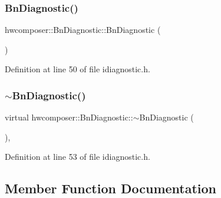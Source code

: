 \subsubsection{\texorpdfstring{Bn\+Diagnostic()}{BnDiagnostic()}}
{\footnotesize\ttfamily hwcomposer\+::\+Bn\+Diagnostic\+::\+Bn\+Diagnostic (\begin{DoxyParamCaption}{ }\end{DoxyParamCaption})\hspace{0.3cm}{\ttfamily [inline]}}



Definition at line 50 of file idiagnostic.\+h.


\begin{DoxyCode}{0}
\end{DoxyCode}
\mbox{\label{classhwcomposer_1_1BnDiagnostic_acb90849642dd99099514c8d4ec1ee55b}} 
\subsubsection{\texorpdfstring{$\sim$\+Bn\+Diagnostic()}{~BnDiagnostic()}}
{\footnotesize\ttfamily virtual hwcomposer\+::\+Bn\+Diagnostic\+::$\sim$\+Bn\+Diagnostic (\begin{DoxyParamCaption}{ }\end{DoxyParamCaption})\hspace{0.3cm}{\ttfamily [inline]}, {\ttfamily [virtual]}}



Definition at line 53 of file idiagnostic.\+h.


\begin{DoxyCode}{0}
\end{DoxyCode}


\subsection{Member Function Documentation}
\mbox{\label{classhwcomposer_1_1BnDiagnostic_a3b524b73de19be10529cefa88ecd59ff}} 
